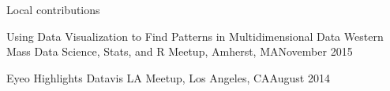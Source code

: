 \documentclass{resume} %
\begin{document}
\begin{rSection}{Local contributions}
\begin{sSubsection}{Using Data Visualization to Find Patterns in Multidimensional Data}{ }{}{Western Mass Data Science, Stats, and R Meetup, Amherst, MA}{November 2015}
\end{sSubsection}



\begin{sSubsection}{Eyeo Highlights}{ }{}{Datavis LA Meetup, Los Angeles, CA}{August 2014}
\end{sSubsection}

\end{rSection}





\end{document}
